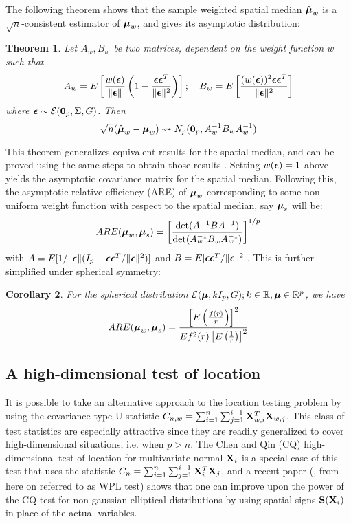 \documentclass[12pt,letterpaper]{article}
\newtheorem{Theorem}{Theorem}[section]
\newtheorem{Corollary}[Theorem]{Corollary}
\theoremstyle{definition} \newtheorem{Definition}[Theorem]{Definition}
\begin{document}
The following theorem shows that the sample weighted spatial median $\hat{{\boldsymbol{\mu}}}_w$ is a $\sqrt n$-consistent estimator of ${\boldsymbol{\mu}}_w$, and gives its asymptotic distribution:

\begin{Theorem}
Let $A_w, B_w$ be two matrices, dependent on the weight function $w$ such that
%
$$
A_w = E \left[ \frac{w( {\boldsymbol{\epsilon}} ) }{\| {\boldsymbol{\epsilon}} \|} \left( 1 - \frac{{\boldsymbol{\epsilon}} {\boldsymbol{\epsilon}}^T}{\| {\boldsymbol{\epsilon}} \|^2} \right) \right]; \quad B_w = E \left[ \frac{(w( {\boldsymbol{\epsilon}} ))^2 {\boldsymbol{\epsilon}} {\boldsymbol{\epsilon}}^T}{\| {\boldsymbol{\epsilon}} \|^2} \right]
$$
%
where ${\boldsymbol{\epsilon}} \sim \mathcal E({\bf 0}_p, \Sigma, G)$. Then
%
\begin{equation}
\sqrt n (\hat{{\boldsymbol{\mu}}}_w - {\boldsymbol{\mu}}_w) \leadsto N_p ({\bf 0}_p, A_w^{-1} B_w A_w^{-1})
\end{equation}
\end{Theorem}
%
This theorem generalizes equivalent results for the spatial median, and can be proved using the same steps to obtain those results \citep{OjaBook10}. Setting $w({\boldsymbol{\epsilon}})=1$ above yields the asymptotic covariance matrix for the spatial median. Following this, the asymptotic relative efficiency (ARE) of ${\boldsymbol{\mu}}_w$ corresponding to some non-uniform weight function with respect to the spatial median, say ${\boldsymbol{\mu}}_s$ will be:
%
$$
ARE( {\boldsymbol{\mu}}_w, {\boldsymbol{\mu}}_s) = \left[ \frac{\text{det} (A^{-1} B A^{-1})}{\text{det} (A_w^{-1} B_w A_w^{-1})} \right]^{1/p}
$$
%
with $A = E [ 1/ \| {\boldsymbol{\epsilon}} \| ( I_p - {\boldsymbol{\epsilon}} {\boldsymbol{\epsilon}}^T/ \| {\boldsymbol{\epsilon}} \|^2 ) ]$ and $B = E [ {\boldsymbol{\epsilon}} {\boldsymbol{\epsilon}}^T/ \| {\boldsymbol{\epsilon}} \|^2 ]$. This is further simplified under spherical symmetry:

\begin{Corollary}
For the spherical distribution $\mathcal{E}({\boldsymbol{\mu}}, kI_p, G); k \in \mathbb R, {\boldsymbol{\mu}} \in \mathbb R^p$, we have
%
$$
ARE( {\boldsymbol{\mu}}_w, {\boldsymbol{\mu}}_s) = \frac{ \left[ E \left( \frac{f(r)}{r} \right) \right]^2}{Ef^2(r) \left[ E \left( \frac{1}{r} \right) \right]^2 }
$$
\end{Corollary}

\subsection{A high-dimensional test of location}

It is possible to take an alternative approach to the location testing problem by using the covariance-type U-statistic $C_{n,w} = \sum_{i=1}^n \sum_{j=1}^{i-1} {\mathbf{X}}_{w,i}^T {\mathbf{X}}_{w,j}$. This class of test statistics are especially attractive since they are readily generalized to cover high-dimensional situations, i.e. when $p > n$. The Chen and Qin (CQ) high-dimensional test of location for multivariate normal ${\mathbf{X}}_i$ \citep{ChenQin10} is a special case of this test that uses the statistic $C_n = \sum_{i=1}^n \sum_{j=1}^{i-1} {\mathbf{X}}_i^T {\mathbf{X}}_j$, and a recent paper (\citep{WangPengLi15}, from here on referred to as WPL test) shows that one can improve upon the power of the CQ test for non-gaussian elliptical distributions by using spatial signs ${\mathbf{S}}({\mathbf{X}}_i)$ in place of the actual variables.
\end{document}
